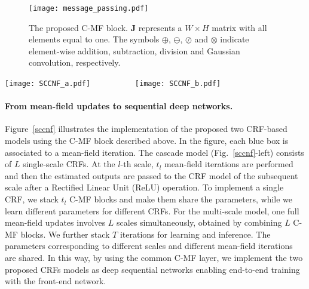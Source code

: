 \documentclass[10pt,twocolumn,letterpaper]{article}
\begin{document}
\begin{figure}[!t]
\centering
\texttt{[image: message\_passing.pdf]} 
\caption{The proposed C-MF block. $\mathbf{J}$ represents a $W\times H$ matrix with all elements equal to one. 
The symbols $\oplus$, $\ominus$, $\oslash$ and $\otimes$ indicate element-wise addition, subtraction, division and Gaussian convolution, respectively.}
\label{fig:HCRF-MF}
\vspace{-0.3cm}
\end{figure}


\begin{figure*}[!t]
\centering
\texttt{[image: SCCNF\_a.pdf]} \ \ \ \ \ \ \ \ \ \ 
\texttt{[image: SCCNF\_b.pdf]} 
\caption{The proposed cascade (left) and multi-scale (right) models as a sequential deep networks. The blue and yellow boxes indicate the
estimated variables and observations, respectively. The parameters ${\beta}_m$ are used for mean-field updates. 
As in the cascade model parameters are not shared among different CRFs, we use the notation 
${\beta}_1^l, {\beta}_2^l$ to denote parameters associated to the $l$-th scale.
}
\label{sccnf}
\vspace{-0.5cm}
\end{figure*}
\paragraph{From mean-field updates to sequential deep networks.}
Figure~\ref{sccnf} illustrates the implementation of the proposed two CRF-based models using the C-MF block described above. 
In the figure, each blue box is associated to a mean-field iteration. 
The cascade model (Fig.~\ref{sccnf}-left) consists of $L$ single-scale CRFs. At the $l$-th scale, 
$t_l$ mean-field iterations are performed and then the estimated outputs are passed to the CRF model of the 
subsequent scale after a Rectified Linear Unit (ReLU) operation. To implement a single CRF, we stack $t_l$ C-MF blocks and 
make them share the parameters, while we learn different parameters for different CRFs. For the multi-scale model, one full 
mean-field updates involves $L$ scales simultaneously, obtained by combining $L$ C-MF blocks. We further stack $T$ 
iterations for learning and inference. The parameters corresponding to different scales and different 
mean-field iterations are shared. In this way, by using the common C-MF layer, we implement the two proposed CRFs models as 
deep sequential networks enabling end-to-end training with the front-end network.
\vspace{-0.45cm}
\end{document}

